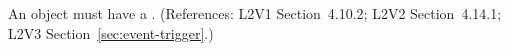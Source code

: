 An \Event object must have a .  (References: L2V1
Section~4.10.2; L2V2 Section~4.14.1; L2V3
Section~\ref{sec:event-trigger}.)
